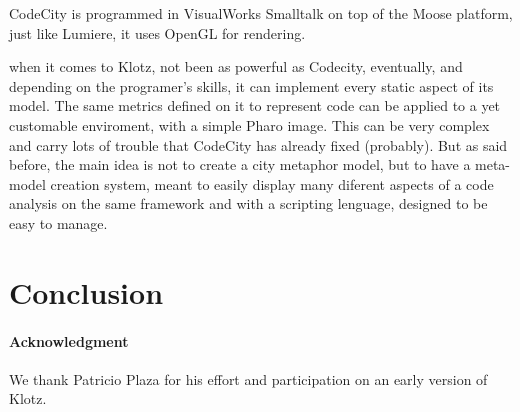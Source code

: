 \documentclass{sig-alternate}
\newcommand{\seclabel}[1]{\label{sec:#1}}
\begin{document}
CodeCity is programmed in VisualWorks Smalltalk on top of the Moose 
platform, just like Lumiere, it uses OpenGL for rendering.

when it comes to Klotz, not been as powerful as Codecity, eventually, 
and depending on the programer's skills, it can implement every static 
aspect of its model. The same metrics defined on it to represent code 
can be applied to a yet customable enviroment, with a simple Pharo image. 
This can be very complex and carry lots of trouble that CodeCity has 
already fixed (probably). But as said before, the main idea is not to 
create a city metaphor model, but to have a meta-model creation system, 
meant to easily display many diferent aspects of a code analysis on the 
same framework and with a scripting lenguage, designed to be easy to manage.


\section{Conclusion} \seclabel{conclusion}


\paragraph{Acknowledgment} 
We thank Patricio Plaza for his effort and participation on an early version of Klotz.

%



\end{document}
